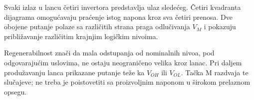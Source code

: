 Svaki izlaz u lancu četiri invertora predstavlja ulaz sledećeg. Četiri kvadranta dijagrama omogućavaju praćenje istog napona kroz sva četiri prenosa. Dve obojene putanje polaze sa različitih strana praga odlučivanja $V_M$ i pokazuju približavanje različitim krajnjim logičkim nivoima.

Regenerabilnost znači da mala odstupanja od nominalnih nivoa, pod odgovarajućim uslovima, ne ostaju neograničeno velika kroz lanac. Pri daljem produžavanju lanca prikazane putanje teže ka $V_{OH}$ ili $V_{OL}$. Tačka M razdvaja te slučajeve; ne treba je poistovetiti sa proizvoljnim naponom u širokom prelaznom opsegu.
